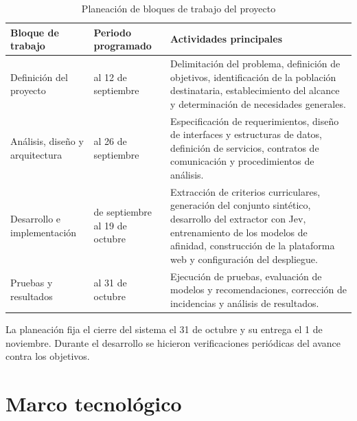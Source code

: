 \begin{table}[ht] 
\centering 
\small
\setlength{\tabcolsep}{4pt}
\renewcommand{\arraystretch}{1.15}
\caption{Planeación de bloques de trabajo del proyecto} 
\label{tab:planeacion} 
\begin{tabularx}{\textwidth}{%
    >{\raggedright\arraybackslash}p{}
    >{\raggedright\arraybackslash}p{}
    >{\raggedright\arraybackslash}X
}
    \toprule 
    \textbf{Bloque de trabajo} & 
    \textbf{Periodo programado} & 
    \textbf{Actividades principales} \\ 
    \midrule 
    Definición del proyecto & 
    8 al 12 de septiembre & 
    Delimitación del problema, definición de objetivos, identificación de la población destinataria, establecimiento del alcance y determinación de necesidades generales. \\ 
    Análisis, diseño y arquitectura & 
    13 al 26 de septiembre & 
    Especificación de requerimientos, diseño de interfaces y estructuras de datos, definición de servicios, contratos de comunicación y procedimientos de análisis. \\ 
    Desarrollo e implementación & 
    27 de septiembre al 19 de octubre & 
    Extracción de criterios curriculares, generación del conjunto sintético, desarrollo del extractor con Jev, entrenamiento de los modelos de afinidad, construcción de la plataforma web y configuración del despliegue. \\
    Pruebas y resultados & 
    20 al 31 de octubre & 
    Ejecución de pruebas, evaluación de modelos y recomendaciones, corrección de incidencias y análisis de resultados. \\ 
    \bottomrule 
\end{tabularx} 
\end{table}

La planeación fija el cierre del sistema el 31 de octubre y su entrega el 1 de noviembre. Durante el desarrollo se hicieron verificaciones periódicas del avance contra los objetivos.

\section{Marco tecnológico}

